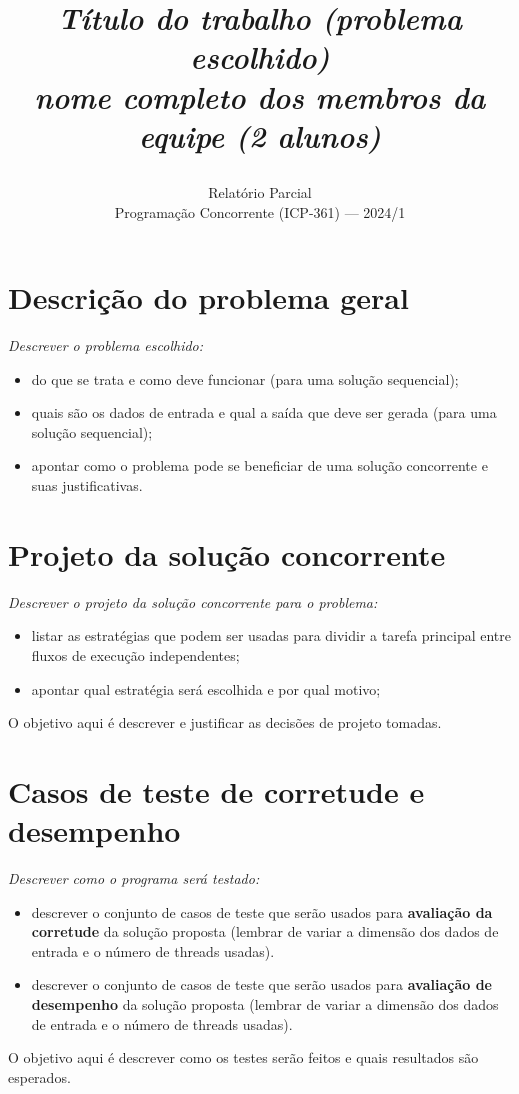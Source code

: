 \documentclass[14]{article}
\begin{document}
\title{{\em Título do trabalho (problema escolhido)} \\ 
{\em \normalsize nome completo dos membros da equipe (2 alunos)}
\author{ {\Large Relatório Parcial} \\ Programação Concorrente (ICP-361) --- 2024/1}
\address{} 
\date{}}

\maketitle

\section{Descrição do problema geral}
{\em Descrever o problema escolhido: 
\begin{itemize}
\item do que se trata e como deve funcionar {\color{red}(para uma solução sequencial)};
\item quais são os dados de entrada e qual a saída que deve ser gerada {\color{red}(para uma solução sequencial)};
\item apontar como o problema pode se beneficiar de uma solução concorrente e suas justificativas.
\end{itemize}
}

\section{Projeto da solução concorrente}
{\em Descrever o projeto da solução concorrente para o problema: 
\begin{itemize}
\item listar as estratégias que podem ser usadas para dividir a tarefa principal entre fluxos
de execução independentes;
\item apontar qual estratégia será escolhida e por qual motivo;		
\end{itemize}
}
{\color{red}O objetivo aqui é descrever e justificar as decisões de projeto tomadas.}

\section{Casos de teste de corretude e desempenho}
{\em Descrever como o programa será testado:
\begin{itemize}
	\item descrever o conjunto de casos de teste que serão usados para {\bf avaliação 
		da corretude} da solução proposta
(lembrar de variar a dimensão dos dados de entrada e o número de threads usadas).
\item descrever o conjunto de casos de teste que serão usados para {\bf avaliação 
	de desempenho} da solução proposta
(lembrar de variar a dimensão dos dados de entrada e o número de threads usadas).
\end{itemize}
}
{\color{red}O objetivo aqui é descrever como os testes
serão feitos e quais resultados são esperados.} 
\end{document}
